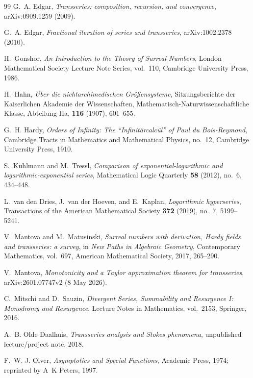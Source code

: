 \documentclass[11pt,openany]{book}
\theoremstyle{definition}
\theoremstyle{plain}
\theoremstyle{remark}
\begin{document}
\begin{thebibliography}{99}
G.~A. Edgar,
\emph{Transseries: composition, recursion, and convergence},
arXiv:0909.1259 (2009).

G.~A. Edgar,
\emph{Fractional iteration of series and transseries},
arXiv:1002.2378 (2010).

H.~Gonshor,
\emph{An Introduction to the Theory of Surreal Numbers},
London Mathematical Society Lecture Note Series, vol.~110,
Cambridge University Press, 1986.

H.~Hahn,
\emph{\"Uber die nichtarchimedischen Gr\"o\ss{}ensysteme},
Sitzungsberichte der Kaiserlichen Akademie der Wissenschaften,
Mathematisch-Naturwissenschaftliche Klasse, Abteilung IIa,
\textbf{116} (1907), 601--655.

G.~H. Hardy,
\emph{Orders of Infinity: The ``Infinit\"arcalc\"ul'' of Paul du Bois-Reymond},
Cambridge Tracts in Mathematics and Mathematical Physics, no.~12,
Cambridge University Press, 1910.

S.~Kuhlmann and M.~Tressl,
\emph{Comparison of exponential-logarithmic and logarithmic-exponential
series},
Mathematical Logic Quarterly \textbf{58} (2012), no.~6, 434--448.

L.~van den Dries, J.~van der Hoeven, and E.~Kaplan,
\emph{Logarithmic hyperseries},
Transactions of the American Mathematical Society \textbf{372} (2019),
no.~7, 5199--5241.

V.~Mantova and M.~Matusinski,
\emph{Surreal numbers with derivation, Hardy fields and transseries: a
survey},
in \emph{New Paths in Algebraic Geometry}, Contemporary Mathematics,
vol.~697, American Mathematical Society, 2017, 265--290.

V.~Mantova,
\emph{Monotonicity and a Taylor approximation theorem for transseries},
arXiv:2601.07747v2 (8 May 2026).

C.~Mitschi and D.~Sauzin,
\emph{Divergent Series, Summability and Resurgence I: Monodromy and
Resurgence}, Lecture Notes in Mathematics, vol.~2153, Springer, 2016.

A.~B. Olde Daalhuis,
\emph{Transseries analysis and Stokes phenomena},
unpublished lecture/project note, 2018.

F.~W. J. Olver,
\emph{Asymptotics and Special Functions},
Academic Press, 1974; reprinted by A~K Peters, 1997.


\end{thebibliography}
\end{document}
